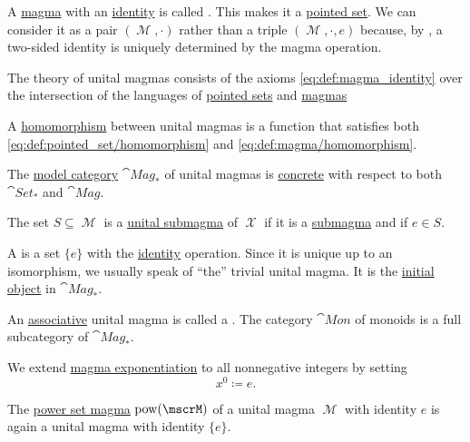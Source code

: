 \begin{definition}\label{def:unital_magma}
  A \hyperref[def:magma]{magma} with an \hyperref[def:magma_identity]{identity} is called . This makes it a \hyperref[def:pointed_set]{pointed set}. We can consider it as a pair \( (\mscrM, \cdot) \) rather than a triple \( (\mscrM, \cdot, e) \) because, by , a two-sided identity is uniquely determined by the magma operation.

  \begin{thmenum}
     The theory of unital magmas consists of the axioms \eqref{eq:def:magma_identity} over the intersection of the languages of \hyperref[def:pointed_set/theory]{pointed sets} and \hyperref[def:magma/theory]{magmas}

     A \hyperref[def:first_order_homomorphism]{homomorphism} between unital magmas is a function that satisfies both \eqref{eq:def:pointed_set/homomorphism} and \eqref{eq:def:magma/homomorphism}.

     The \hyperref[def:first_order_model_category]{model category} \( \cat{Mag}_* \) of unital magmas is \hyperref[def:concrete_category]{concrete} with respect to both \hyperref[def:pointed_set/category]{\( \cat{Set}_* \)} and \hyperref[def:magma/category]{\( \cat{Mag} \)}.

     The set \( S \subseteq \mscrM \) is a \hyperref[def:first_order_substructure]{unital submagma} of \( \mscrX \) if it is a \hyperref[def:magma/substructure]{submagma} and if \( e \in S \).

     A  is a set \( \{ e \} \) with the \hyperref[def:function/diagonal]{identity} operation. Since it is unique up to an isomorphism, we usually speak of \enquote{the} trivial unital magma. It is the \hyperref[def:zero_objects/initial]{initial object} in \( \cat{Mag}_* \).

     An \hyperref[eq:def:magma/associative]{associative} unital magma is called a . The category \( \cat{Mon} \) of monoids is a full subcategory of \( \cat{Mag}_* \).

     We extend \hyperref[def:magma/exponentiation]{magma exponentiation} to all nonnegative integers by setting
    \begin{equation*}
      x^0 \coloneqq e.
    \end{equation*}

     The \hyperref[def:magma/power_set]{power set magma} \( \pow(\mscrM) \) of a unital magma \( \mscrM \) with identity \( e \) is again a unital magma with identity \( \{ e \} \).
  \end{thmenum}
\end{definition}

